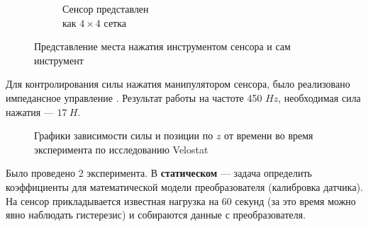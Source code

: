 \begin{figure}[ht]
\begin{subfigure}{0.38\textwidth}
        \caption{Сенсор представлен \\ как $4\times4$ сетка}
        \label{fig:sensor_grid}
    \end{subfigure}
    \caption{Представление места нажатия инструментом сенсора и сам инструмент}
\end{figure}

Для контролирования силы нажатия манипулятором сенсора, было реализовано импедансное управление . Результат работы на частоте 450 $Hz$, необходимая сила нажатия --- $17\ H$.
\begin{figure}[h]
        \centering
        \caption{Графики зависимости силы и позиции по $z$ от времени во время эксперимента по исследованию Velostat}
        \label{fig:force_data_pos.png}
    \end{figure}

Было проведено 2 эксперимента. В \textbf{статическом} --- задача определить коэффициенты для математической модели преобразователя (калибровка датчика). На сенсор прикладывается известная нагрузка на 60 секунд (за это время можно явно наблюдать гистерезис) и собираются данные с преобразователя.

